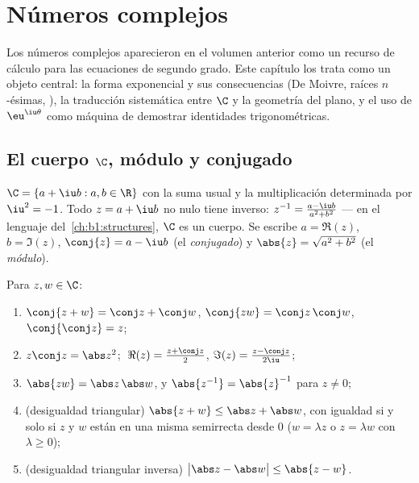 \chapter{Números complejos}\label{ch:b1:complex}

Los números complejos aparecieron en el volumen anterior como un
recurso de cálculo para las ecuaciones de segundo grado. Este capítulo
los trata como un objeto central: la forma exponencial y sus
consecuencias (De Moivre, raíces $n$-ésimas, ), la
traducción sistemática entre $\C$ y la geometría del plano, y el uso de
$\eu^{\iu\theta}$ como máquina de demostrar identidades
trigonométricas.

\section{El cuerpo $\C$, módulo y conjugado}

\begin{definition}\label{def:b1:complex:field}
$\C = \{a + \iu b : a, b \in \R\}$ con la suma usual y la
multiplicación determinada por $\iu^2 = -1$. Todo $z = a + \iu b$ no
nulo tiene inverso: $z^{-1} = \frac{a - \iu b}{a^2 + b^2}$ --- en el
lenguaje del~\cref{ch:b1:structures}, $\C$ es un cuerpo. Se escribe
$a = \Re(z)$, $b = \Im(z)$, $\conj{z} = a - \iu b$ (el
\emph{conjugado}) y $\abs{z} = \sqrt{a^2 + b^2}$ (el
\emph{módulo}).
\end{definition}

\begin{proposition}\label{prop:b1:complex:rules}
Para $z, w \in \C$:
\begin{enumerate}
  \item $\conj{z + w} = \conj z + \conj w$, $\conj{zw} = \conj z\,
        \conj w$, $\conj{\conj z} = z$;
  \item $z \conj z = \abs z^2$; $\;\Re(z) = \frac{z + \conj z}{2}$,
        $\Im(z) = \frac{z - \conj z}{2\iu}$;
  \item $\abs{zw} = \abs z\, \abs w$, y $\abs{z^{-1}} =
        \abs{z}^{-1}$ para $z \neq 0$;
  \item (desigualdad triangular)
        $\abs{z + w} \leq \abs z + \abs w$, con igualdad si y solo si
        $z$ y $w$ están en una misma semirrecta desde $0$ ($w =
        \lambda z$ o $z = \lambda w$ con $\lambda \geq 0$);
  \item (desigualdad triangular inversa) $\bigl|\abs z - \abs w\bigr|
        \leq \abs{z - w}$.
\end{enumerate}
\end{proposition}

